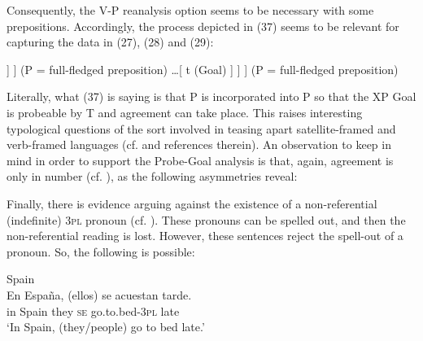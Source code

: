 \documentclass[output=paper]{langsci/langscibook}
\begin{document}
Consequently, the V-P reanalysis option seems to be necessary with some prepositions. Accordingly, the process depicted in (37) seems to be relevant for capturing the data in (27), (28) and (29):


\ea%
    \label{ex:gallego:37}
    \ea\onehalfspacing\relax [ SE \ConnectTail{\textbf{T}} ($\varphi $-Probe)  [\textsubscript{VP} V \ldots\xspace [  P \ConnectHead{\textbf{XP}} (Goal) ] ] ] (P = full-fledged preposition) 
    \ex\onehalfspacing\relax [ SE \ConnectTail{\textbf{T}} ($\varphi $-Probe)  [\textsubscript{VP} [V-P] \ldots\xspace [ t   (Goal) ] ] ] (P = full-fledged preposition)
    \z
\z


Literally, what (37) is saying is that P is incorporated into P so that the XP Goal is probeable by T and agreement can take place. This raises interesting typological questions of the sort involved in teasing apart satellite-framed and verb-framed languages (cf. \citealt{Mateu2012} and references therein). An observation to keep in mind in order to support the Probe-Goal analysis is that, again, agreement is only in number (cf. \citealt{Etxepare2006}), as the following asymmetries reveal:



    \z
    
Finally, there is evidence arguing against the existence of a non-referential (indefinite) \textsc{3pl} pronoun (cf. \citealt{Suñer1983,Cabredo2003}). These pronouns can be spelled out, and then the non-referential reading is lost. However, these sentences reject the spell-out of a pronoun. So, the following is possible:

\ea%
    Spain\label{ex:gallego:39}\\
    \gll En España, (ellos)  se  acuestan            tarde.    \\
         in  Spain       they   \textsc{se} go.to.bed-\textsc{3pl}   late\\
    \glt ‘In Spain, (they/people) go to bed late.’
    \z
\end{document}
